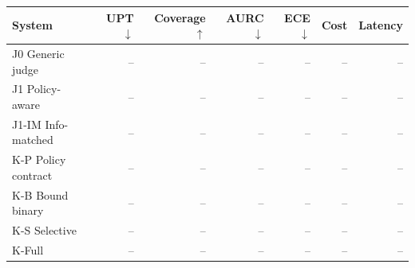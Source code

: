 \begin{tabular}{lrrrrrr}
\toprule
System & UPT $\downarrow$ & Coverage $\uparrow$ & AURC $\downarrow$ & ECE $\downarrow$ & Cost & Latency \\
\midrule
J0 Generic judge & -- & -- & -- & -- & -- & -- \\
J1 Policy-aware & -- & -- & -- & -- & -- & -- \\
J1-IM Info-matched & -- & -- & -- & -- & -- & -- \\
K-P Policy contract & -- & -- & -- & -- & -- & -- \\
K-B Bound binary & -- & -- & -- & -- & -- & -- \\
K-S Selective & -- & -- & -- & -- & -- & -- \\
K-Full & -- & -- & -- & -- & -- & -- \\
\bottomrule
\end{tabular}
